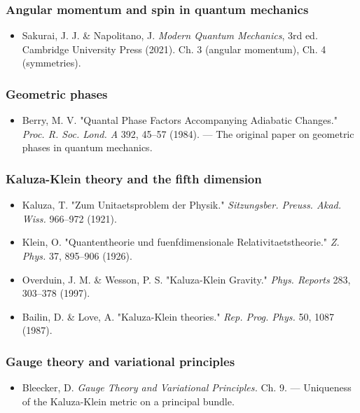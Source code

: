 \documentclass[aps,prd,preprint,superscriptaddress,longbibliography,floatfix]{revtex4-2}
\theoremstyle{remark}
\begin{document}
\subsubsection{Angular momentum and spin in quantum mechanics}


\begin{itemize}
  \item Sakurai, J. J. \& Napolitano, J. \textit{Modern Quantum Mechanics}, 3rd ed. Cambridge University Press (2021). Ch. 3 (angular momentum), Ch. 4 (symmetries).
\end{itemize}


\subsubsection{Geometric phases}


\begin{itemize}
  \item Berry, M. V. "Quantal Phase Factors Accompanying Adiabatic Changes." \textit{Proc. R. Soc. Lond. A} 392, 45--57 (1984). --- The original paper on geometric phases in quantum mechanics.
\end{itemize}


\subsubsection{Kaluza-Klein theory and the fifth dimension}


\begin{itemize}
  \item Kaluza, T. "Zum Unitaetsproblem der Physik." \textit{Sitzungsber. Preuss. Akad. Wiss.} 966--972 (1921).
  \item Klein, O. "Quantentheorie und fuenfdimensionale Relativitaetstheorie." \textit{Z. Phys.} 37, 895--906 (1926).
  \item Overduin, J. M. \& Wesson, P. S. "Kaluza-Klein Gravity." \textit{Phys. Reports} 283, 303--378 (1997).
  \item Bailin, D. \& Love, A. "Kaluza-Klein theories." \textit{Rep. Prog. Phys.} 50, 1087 (1987).
\end{itemize}


\subsubsection{Gauge theory and variational principles}


\begin{itemize}
  \item Bleecker, D. \textit{Gauge Theory and Variational Principles.} Ch. 9. --- Uniqueness of the Kaluza-Klein metric on a principal bundle.
\end{itemize}
\end{document}

